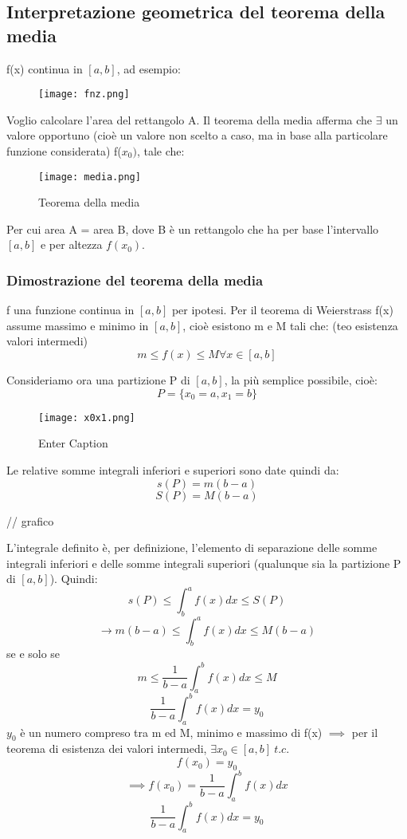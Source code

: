 \documentclass[../../main.tex]{subfiles}
\begin{document}
\newpage
\subsection{Interpretazione geometrica del teorema della media}
f(x) continua in $[a, b]$, ad esempio:

\begin{figure}[ht]
    \centering
    \texttt{[image: fnz.png]}\label{fig:teorema-media}
\end{figure}

Voglio calcolare l'area del rettangolo A. Il teorema della media afferma che
$\exists$ un valore opportuno (cioè un valore non scelto a caso, ma in base
alla particolare funzione considerata) f($x_0)$, tale che:

\begin{figure}[!ht]
    \centering
    \texttt{[image: media.png]}
    \caption{Teorema della media}\label{fig:media}
\end{figure}

Per cui area A = area B, dove B è un rettangolo che ha per base l'intervallo
$[a, b]$ e per altezza $f(x_0)$.

\subsubsection{Dimostrazione del teorema della media}
f una funzione continua in $[a, b]$ per ipotesi. Per il teorema di Weierstrass
f(x) assume massimo e minimo in $[a, b]$, cioè esistono m e M tali che: (teo
esistenza valori intermedi)\[m\leq f(x) \leq M \forall x \in [a, b]\]

Consideriamo ora una partizione P di $[a, b]$, la più semplice possibile, cioè:
\[P = \{x_0 = a, x_1 = b\}\]

\begin{figure}[!ht]
    \centering
    \texttt{[image: x0x1.png]}
    \caption{Enter Caption}\label{fig:enter-label}
\end{figure}

Le relative somme integrali inferiori e superiori sono date quindi da:\[s(P) =
    m(b-a)\]\[S(P) = M(b-a)\]

// grafico

L'integrale definito è, per definizione, l'elemento di separazione delle somme
integrali inferiori e delle somme integrali superiori (qualunque sia la
partizione P di $[a, b]$). Quindi:\[s(P) \leq \int_b^af(x)dx \leq S(P)\]
\[\rightarrow m(b-a) \leq \int_b^af(x)dx \leq M(b-a)\] se e solo se\[m \leq
    \frac{1}{b-a}\int_a^bf(x)dx \leq M\]\[\frac{1}{b-a}\int_a^bf(x)dx = y_0\]
$y_0$ è un numero compreso tra m ed M, minimo e massimo di f(x) $\implies$ per
il teorema di esistenza dei valori intermedi, $\exists x_0 \in [a, b] \ t.c.$
\[f(x_0)=y_0\]\[\implies f(x_0) = \frac{1}{b-a}\int_a^bf(x)dx\]
\[\frac{1}{b-a}\int_a^bf(x)dx = y_0\]
\end{document}
